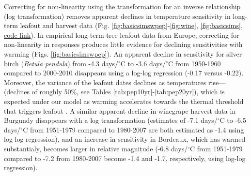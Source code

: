 \documentclass[11pt,letter]{article}
\begin{document}
Correcting for non-linearity using the transformation for an inverse relationship (log transformation) removes apparent declines in temperature sensitivity in long-term leafout and harvest data (Fig. \ref{fig:basicsimswpep}-\ref{fig:wine}, \ref{fig:basicsims}, \href{https://github.com/temporalecologylab/labgit/tree/master/projects/decsenspost}{code link}). In empirical long-term tree leafout data from Europe, correcting for non-linearity in responses produces little evidence for declining sensitivities with warming (Figs. \ref{fig:basicsimswpep}). An apparent decline in sensitivity for silver birch (\emph{Betula pendula}) from -4.3 days/$^{\circ}$C to -3.6 days/$^{\circ}$C from 1950-1960 compared to 2000-2010 disappears using a log-log regression (-0.17 versus -0.22). Moreover, the variance of the leafout dates declines as temperatures rise---(declines of roughly 50\%, see Tables \ref{tab:pep10yr}-\ref{tab:pep20yr}), which is expected under our model as warming accelerates towards the thermal threshold that triggers leafout \citep[and in contrast to predictions from changing mechanisms, see][]{ford2016}. A similar apparent decline in winegrape harvest data in Burgundy disappears with a log transformation (estimates of -7.1 days/$^{\circ}$C to -6.5 days/$^{\circ}$C from 1951-1979 compared to 1980-2007 are both estimated as -1.4 using log-log regression), and an increase in sensitivity in Bordeaux, which has warmed substantialy, becomes larger in relative magnitude (-6.8 days/$^{\circ}$C from 1951-1979 compared to -7.2 from 1980-2007 become -1.4 and -1.7, respectively, using log-log regression). \\
\end{document}
